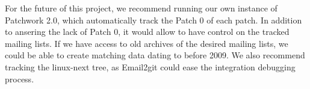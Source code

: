 For the future of this project, we recommend running our own instance of Patchwork 2.0, which automatically track the Patch 0 of each patch. In addition to ansering the lack of Patch 0, it would allow to have control on the tracked mailing lists. If we have access to old archives of the desired mailing lists, we could be able to create matching data dating to before 2009. We also recommend tracking the linux-next tree, as Email2git could ease the integration debugging process. 